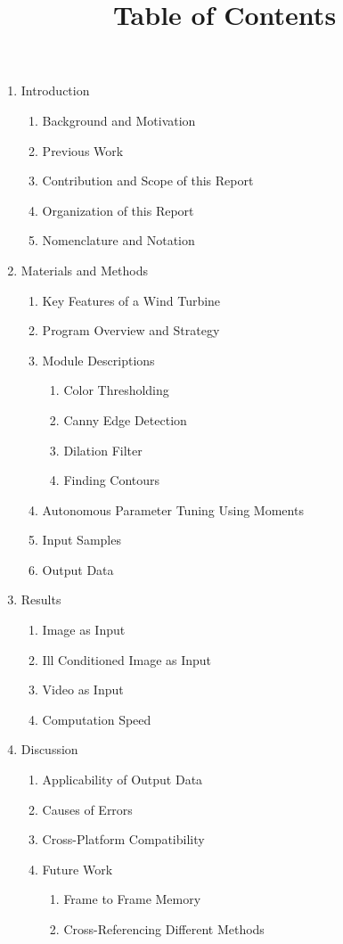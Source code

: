 \documentclass[a4paper,10pt]{article}
\begin{document}
\title{Table of Contents}
\date{}
\maketitle

\begin{enumerate}
  \item Introduction
  \begin{enumerate}
    \item Background and Motivation
    \item Previous Work
    \item Contribution and Scope of this Report
    \item Organization of this Report
    \item Nomenclature and Notation
  \end{enumerate}
  
  \item Materials and Methods
  \begin{enumerate}
    \item Key Features of a Wind Turbine
    \item Program Overview and Strategy
    \item Module Descriptions
    \begin{enumerate}
      \item Color Thresholding
      \item Canny Edge Detection
      \item Dilation Filter
      \item Finding Contours 
    \end{enumerate}
    \item Autonomous Parameter Tuning Using Moments
    \item Input Samples
    \item Output Data
  \end{enumerate}

  \item Results
  \begin{enumerate}
    \item Image as Input
    \item Ill Conditioned Image as Input
    \item Video as Input
    \item Computation Speed
  \end{enumerate}

  \item Discussion
  \begin{enumerate}
    \item Applicability of Output Data
    \item Causes of Errors
    \item Cross-Platform Compatibility
    \item Future Work
    \begin{enumerate}
     \item Frame to Frame Memory
     \item Cross-Referencing Different Methods
    \end{enumerate}


\end{enumerate}
\end{enumerate}
\end{document}
